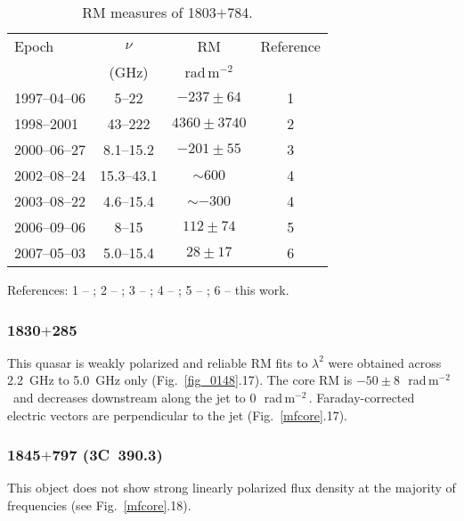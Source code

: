 \documentclass[a4paper,fleqn,usenatbib,useAMS]{mnras}
\newcommand{\rmu}{\,rad\,m$^{-2}$\,} %
\begin{document}
\begin{table}
  \caption{RM measures of 1803$+$784.\label{t:1803}}
  \begin{center}
  \begin{tabular}{lccc}
  \hline
   Epoch & $\nu$ & RM & Reference\\
   & (GHz) & \rmu & \\
\hline   
1997--04--06 & 5--22 & $-237\pm64$ & 1\\
1998--2001 & 43--222 & $4360\pm3740$ & 2\\
2000--06--27 & 8.1--15.2 & $-201\pm55$ & 3\\
2002--08--24 & 15.3--43.1 & $\sim600$ & 4\\
2003--08--22 & 4.6--15.4 & $\sim-300$ & 4\\
2006--09--06 & 8--15 & $112\pm74$ & 5\\
2007--05--03 & 5.0--15.4& $28\pm17$ & 6\\
\hline
\end{tabular}
\end{center}
\medskip

References: 1 -- \citet{2003MNRAS.339..669G}; 2 -- \citet{jorstad_etal07}; 3 -- \citet{zavala_taylor_03}; 4 -- \citet{mahmud_etal09}; 5 -- \citet{hovatta_etal12}; 6 -- this work.
\end{table}


\subsubsection{1830$+$285}
This quasar is weakly polarized and reliable RM fits to $\lambda^2$ were obtained across 2.2~GHz to 5.0~GHz only (Fig.~\ref{fig_0148}.17). 
The core RM is $-50\pm8$~\rmu\ and decreases downstream along the jet to 0~\rmu.
Faraday-corrected electric vectors are perpendicular to the jet (Fig.~\ref{mfcore}.17).

\subsubsection{1845$+$797 (3C~390.3)}
This object does not show strong linearly polarized flux density at the majority of frequencies (see Fig.~\ref{mfcore}.18).
\end{document}
